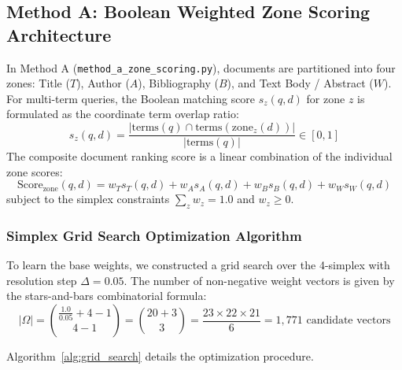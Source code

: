 \documentclass[11pt,a4paper]{article}
\begin{document}
\subsection{Method A: Boolean Weighted Zone Scoring Architecture}
In Method A (\texttt{method\_a\_zone\_scoring.py}), documents are partitioned into four zones: Title ($T$), Author ($A$), Bibliography ($B$), and Text Body / Abstract ($W$). For multi-term queries, the Boolean matching score $s_z(q, d)$ for zone $z$ is formulated as the coordinate term overlap ratio:
\begin{equation}
s_z(q, d) = \frac{|\text{terms}(q) \cap \text{terms}(\text{zone}_z(d))|}{|\text{terms}(q)|} \in [0, 1]
\label{eq:zone_score_individual}
\end{equation}
The composite document ranking score is a linear combination of the individual zone scores:
\begin{equation}
\text{Score}_{\text{zone}}(q, d) = w_T s_T(q, d) + w_A s_A(q, d) + w_B s_B(q, d) + w_W s_W(q, d)
\label{eq:zone_score_composite}
\end{equation}
subject to the simplex constraints $\sum_{z} w_z = 1.0$ and $w_z \ge 0$.

\subsubsection{Simplex Grid Search Optimization Algorithm}
To learn the base weights, we constructed a grid search over the 4-simplex with resolution step $\Delta = 0.05$. The number of non-negative weight vectors is given by the stars-and-bars combinatorial formula:
\begin{equation}
|\Omega| = \binom{\frac{1.0}{0.05} + 4 - 1}{4 - 1} = \binom{20 + 3}{3} = \frac{23 \times 22 \times 21}{6} = 1,771 \text{ candidate vectors}
\end{equation}

Algorithm~\ref{alg:grid_search} details the optimization procedure.
\end{document}
